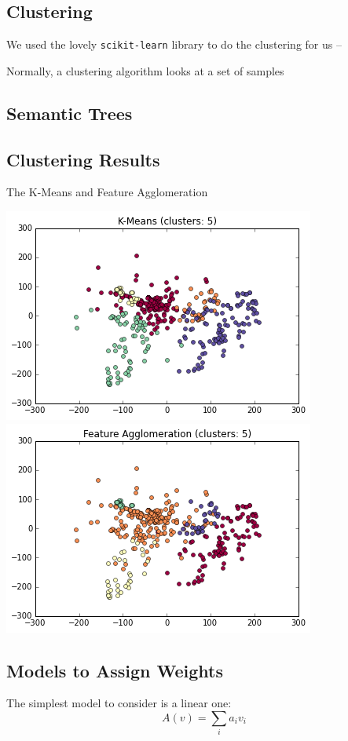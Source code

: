 \documentclass[paper.tex]{subfiles}
\begin{document}
	\subsection{Clustering}
	We used the lovely \texttt{scikit-learn} library to do the clustering for us -- 
	
	Normally, a clustering algorithm looks at a set of samples
	
	
	\subsection{Semantic Trees}
	
	\subsection{Clustering Results}
	The K-Means and Feature Agglomeration
	
	\includegraphics[width=0.5\linewidth]{images/clusters_km_5.png}
	\includegraphics[width=0.5\linewidth]{images/clusters_fa_5.png}
		
	\subsection{Models to Assign Weights}
	The simplest model to consider is a linear one:
	\[A(v) = \sum_i a_i v_i \]
	
\end{document}
